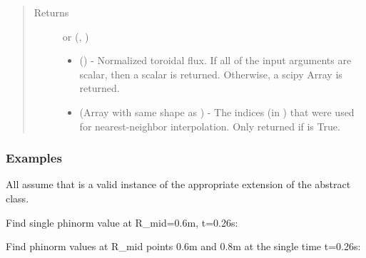 \documentclass[letterpaper,10pt,english]{sphinxmanual}
\begin{document}
\begin{fulllineitems}
\begin{fulllineitems}
\begin{quote}
\begin{description}
\item[{Returns}] \leavevmode

 or (, )
\begin{itemize}
\item {} 
 () - Normalized toroidal flux.
If all of the input arguments are scalar, then a scalar is
returned. Otherwise, a scipy Array is returned.

\item {} 
 (Array with same shape as ) - The indices
(in ) that were used for
nearest-neighbor interpolation. Only returned if  is
True.

\end{itemize}


\end{description}\end{quote}
\subsubsection*{Examples}

All assume that  is a valid instance of the appropriate
extension of the {\hyperref[\detokenize{eqtools:eqtools.core.Equilibrium}]{}} abstract class.

Find single phinorm value at R\_mid=0.6m, t=0.26s:

\begin{sphinxVerbatim}[commandchars=\\\{\}]
   
\end{sphinxVerbatim}

Find phinorm values at R\_mid points 0.6m and 0.8m at the single time
t=0.26s:

\begin{sphinxVerbatim}[commandchars=\\\{\}]
  \PYG{p}{[} \PYG{p}{]} 
\end{sphinxVerbatim}


\end{fulllineitems}
\end{fulllineitems}
\end{document}
